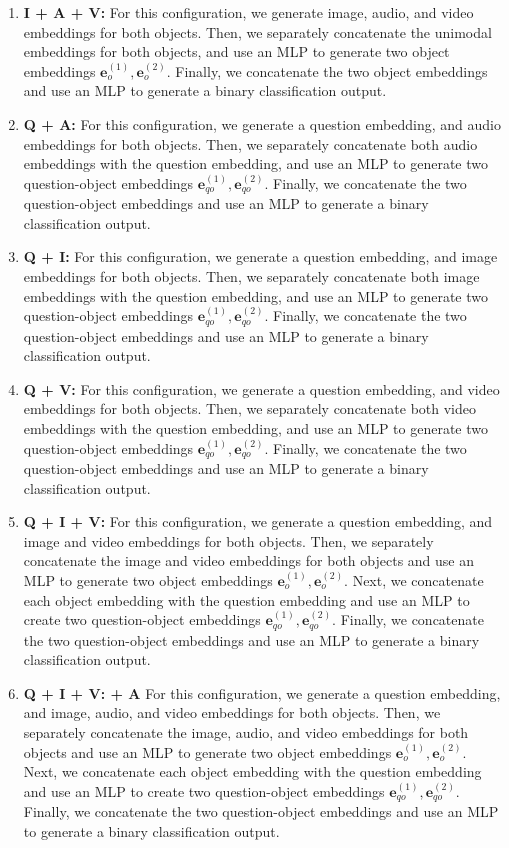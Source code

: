 \documentclass[runningheads]{llncs}
\begin{document}
\begin{enumerate}
    \item \textbf{I + A + V:} For this configuration, we generate image, audio, and video embeddings for both objects. Then, we separately concatenate the unimodal embeddings for both objects, and use an MLP to generate two object embeddings $\boldsymbol{e}_o^{(1)}, \boldsymbol{e}_o^{(2)}$. Finally, we concatenate the two object embeddings and use an MLP to generate a binary classification output. 
    \item \textbf{Q + A:} For this configuration, we generate a question embedding, and audio embeddings for both objects. Then, we separately concatenate both audio embeddings with the question embedding, and use an MLP to generate two question-object embeddings $\boldsymbol{e}_{qo}^{(1)}, \boldsymbol{e}_{qo}^{(2)}$. Finally, we concatenate the two question-object embeddings and use an MLP to generate a binary classification output.  
    \item \textbf{Q + I:} For this configuration, we generate a question embedding, and image embeddings for both objects. Then, we separately concatenate both image embeddings with the question embedding, and use an MLP to generate two question-object embeddings $\boldsymbol{e}_{qo}^{(1)}, \boldsymbol{e}_{qo}^{(2)}$. Finally, we concatenate the two question-object embeddings and use an MLP to generate a binary classification output.  
    \item \textbf{Q + V:} For this configuration, we generate a question embedding, and video embeddings for both objects. Then, we separately concatenate both video embeddings with the question embedding, and use an MLP to generate two question-object embeddings $\boldsymbol{e}_{qo}^{(1)}, \boldsymbol{e}_{qo}^{(2)}$. Finally, we concatenate the two question-object embeddings and use an MLP to generate a binary classification output.  
    \item \textbf{Q + I + V:} For this configuration, we generate a question embedding, and image and video embeddings for both objects. Then, we separately concatenate the image and video embeddings for both objects and use an MLP to generate two object embeddings $\boldsymbol{e}_o^{(1)}, \boldsymbol{e}_o^{(2)}$. Next, we concatenate each object embedding with the question embedding and use an MLP to create two question-object embeddings $\boldsymbol{e}_{qo}^{(1)}, \boldsymbol{e}_{qo}^{(2)}$. Finally, we concatenate the two question-object embeddings and use an MLP to generate a binary classification output. 
    \item \textbf{Q + I + V: + A} For this configuration, we generate a question embedding, and image, audio, and video embeddings for both objects. Then, we separately concatenate the image, audio, and video embeddings for both objects and use an MLP to generate two object embeddings $\boldsymbol{e}_o^{(1)}, \boldsymbol{e}_o^{(2)}$. Next, we concatenate each object embedding with the question embedding and use an MLP to create two question-object embeddings $\boldsymbol{e}_{qo}^{(1)}, \boldsymbol{e}_{qo}^{(2)}$. Finally, we concatenate the two question-object embeddings and use an MLP to generate a binary classification output. 
\end{enumerate}
\end{document}
